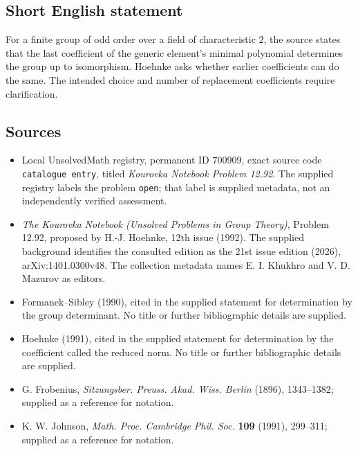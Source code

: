 \documentclass[11pt]{article}
\begin{document}
\subsection{Short English statement}
For a finite group of odd order over a field of characteristic \(2\), the source states that the last coefficient of the generic element's minimal polynomial determines the group up to isomorphism. Hoehnke asks whether earlier coefficients can do the same. The intended choice and number of replacement coefficients require clarification.
\subsection{Sources}
\begin{itemize}
\item Local UnsolvedMath registry, permanent ID \(700909\), exact source code \texttt{catalogue entry}, titled \emph{Kourovka Notebook Problem 12.92}. The supplied registry labels the problem \texttt{open}; that label is supplied metadata, not an independently verified assessment.
\item \emph{The Kourovka Notebook (Unsolved Problems in Group Theory)}, Problem 12.92, proposed by H.-J. Hoehnke, 12th issue (1992). The supplied background identifies the consulted edition as the 21st issue edition (2026), arXiv:1401.0300v48. The collection metadata names E. I. Khukhro and V. D. Mazurov as editors.
\item Formanek--Sibley (1990), cited in the supplied statement for determination by the group determinant. No title or further bibliographic details are supplied.
\item Hoehnke (1991), cited in the supplied statement for determination by the coefficient called the reduced norm. No title or further bibliographic details are supplied.
\item G. Frobenius, \emph{Sitzungsber. Preuss. Akad. Wiss. Berlin} (1896), 1343--1382; supplied as a reference for notation.
\item K. W. Johnson, \emph{Math. Proc. Cambridge Phil. Soc.} \textbf{109} (1991), 299--311; supplied as a reference for notation.
\end{itemize}
\end{document}
